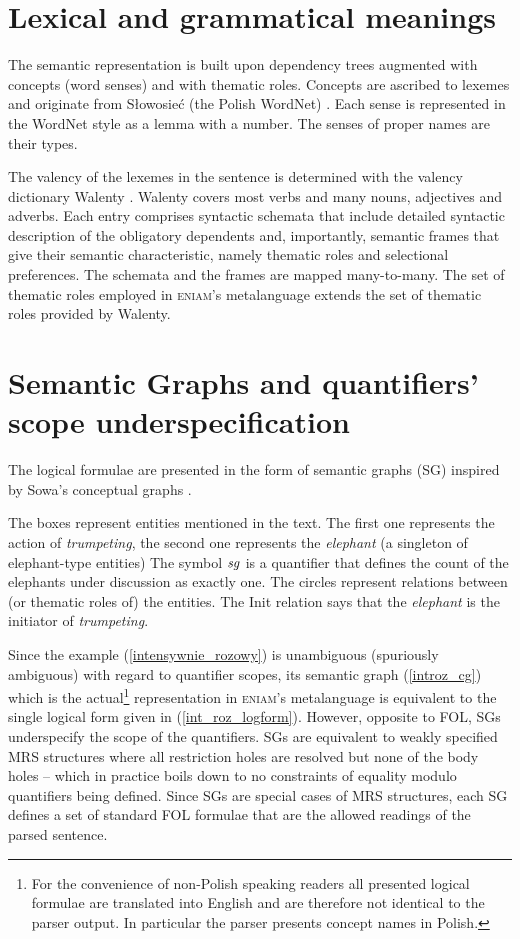 \documentclass[11pt]{article}
\newcommand{\existsg}{{\it sg}}
\newcommand{\eniam}{\textsc{eniam}}
\newcommand{\sg}{\textsc{SG}}
\begin{document}
\section{Lexical and grammatical meanings}
The semantic representation is built upon dependency trees augmented with concepts (word senses) and with thematic roles.
Concepts are ascribed to lexemes and originate  from Słowosieć (the Polish WordNet) \cite{maziarz2014plwordnet}.
Each sense is represented in the WordNet style as a lemma with a number.
The senses of proper names are their types.

The valency of the lexemes in the sentence is determined with the valency dictionary Walenty \cite{prz:etal:14b}.
Walenty covers most verbs and many nouns, adjectives and adverbs. Each entry comprises syntactic schemata that include detailed syntactic description of the obligatory dependents and, importantly, semantic frames that give their semantic characteristic, namely thematic roles and selectional preferences. The schemata and the frames are mapped many-to-many.   
The set of thematic roles employed in \eniam's metalanguage extends the set of thematic roles provided by Walenty.
    

\section{Semantic Graphs and quantifiers' scope underspecification}
The logical formulae are presented in the form of semantic graphs (\sg) inspired by Sowa's conceptual graphs \cite{Sowa:1984:CSI:4569}.

The boxes represent entities mentioned in the text. The first one
represents the action of \textit{trumpeting},
the second one
represents the \textit{elephant} (a singleton of elephant-type entities)
The symbol $\existsg$ is a quantifier that defines the count of the elephants under discussion as exactly one.
The circles represent relations between (or thematic roles of) the entities. The Init relation says that the \textit{elephant} is the initiator of \textit{trumpeting}.

Since the example (\ref{intensywnie_rozowy}) is unambiguous (spuriously ambiguous) with regard to quantifier scopes, 
its semantic graph (\ref{introz_cg}) which is the actual\footnote{For the convenience of non-Polish speaking readers all presented logical formulae are translated into English and are therefore not identical to the parser output. In particular the parser presents concept names in Polish.}
 representation in \eniam's metalanguage
is equivalent to
the single logical form given in (\ref{int_roz_logform}). 
However, opposite to FOL, \sg{}s underspecify the scope of the quantifiers. \sg{}s are equivalent to weakly specified MRS structures \cite{copestake2005mrs} where all restriction holes are resolved but none of the body holes -- which in practice boils down to no constraints of equality modulo quantifiers being defined. Since \sg{}s are special cases of MRS structures, each \sg{} defines a set of standard FOL formulae that are the allowed readings of the parsed sentence.
\end{document}
